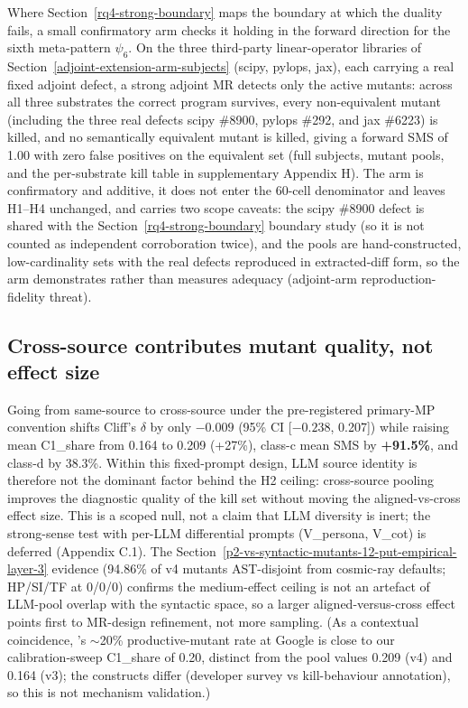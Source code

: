 \documentclass[manuscript,screen,review]{acmart}
\begin{document}
Where Section~\ref{rq4-strong-boundary} maps the boundary at which the duality fails, a small
confirmatory arm checks it holding in the forward direction for the sixth
meta-pattern $\psi_6$. On the three third-party linear-operator libraries
of Section~\ref{adjoint-extension-arm-subjects} (scipy, pylops, jax), each carrying a real fixed adjoint defect, a
strong adjoint MR detects only the active mutants: across all three
substrates the correct program survives, every non-equivalent mutant
(including the three real defects scipy \#8900, pylops \#292, and jax
\#6223) is killed, and no semantically equivalent mutant is killed, giving
a forward SMS of 1.00 with zero false positives on the equivalent set
(full subjects, mutant pools, and the per-substrate kill table in
supplementary Appendix H). The arm is confirmatory and additive, it
does not enter the 60-cell denominator and leaves H1--H4 unchanged, and
carries two scope caveats: the scipy \#8900 defect is shared with the Section~\ref{rq4-strong-boundary}
boundary study (so it is not counted as independent corroboration twice),
and the pools are hand-constructed, low-cardinality sets with the real
defects reproduced in extracted-diff form, so the arm demonstrates rather
than measures adequacy (adjoint-arm reproduction-fidelity threat).


\label{discussion}

\subsection{Cross-source contributes mutant quality, not effect size}\label{cross-source-contributes-mutant-quality-not-effect-size}

Going from same-source to cross-source under the pre-registered primary-MP
convention shifts Cliff's $\delta$ by only $-0.009$ (95\% CI {[}$-0.238$,
0.207{]}) while raising mean C1\_share from 0.164 to 0.209 (+27\%), class-c mean
SMS by \textbf{+91.5\%}, and class-d by 38.3\%. Within this fixed-prompt design,
LLM source identity is therefore not the dominant factor behind the H2 ceiling:
cross-source pooling improves the diagnostic quality of the kill set without
moving the aligned-vs-cross effect size. This is a scoped null, not a claim that
LLM diversity is inert; the strong-sense test with per-LLM differential prompts
(V\_persona, V\_cot) is deferred (Appendix C.1). The
Section~\ref{p2-vs-syntactic-mutants-12-put-empirical-layer-3} evidence (94.86\%
of v4 mutants AST-disjoint from cosmic-ray defaults; HP/SI/TF at 0/0/0) confirms
the medium-effect ceiling is not an artefact of LLM-pool overlap with the
syntactic space, so a larger aligned-versus-cross effect points first to
MR-design refinement, not more sampling. (As a contextual coincidence,
\citeauthor{petrovic2021improve}'s \citeyearpar{petrovic2021improve}
$\sim$20\% productive-mutant rate at Google is close to our calibration-sweep
C1\_share of 0.20, distinct from the pool values 0.209 (v4) and 0.164 (v3); the
constructs differ (developer survey vs kill-behaviour annotation), so this is
not mechanism validation.)
\end{document}
